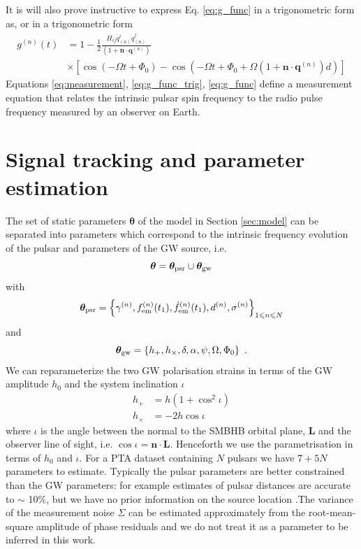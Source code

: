 \documentclass[fleqn,usenatbib,useAMS]{mnras}
\begin{document}
It is will also prove instructive to express Eq. \ref{eq:g_func} in a trigonometric form as,
or in a trigonometric form 
\begin{align}
	g^{(n)}(t) &= 1 - \frac{1}{2} \frac{ H_{ij}q^i_{(n)} q^j_{(n)} }{(1 + \boldsymbol{n}\cdot \boldsymbol{q}^{(n)}) } \nonumber \\
	& \times \left[ \cos(-\Omega t +\Phi_0) - \cos \left(-\Omega t +\Phi_0 + \Omega \left(1 + \boldsymbol{n}\cdot \boldsymbol{q}^{(n)} \right)  d \right) \right]
	\label{eq:g_func_trig}
\end{align}
Equations \ref{eq:measurement}, \ref{eq:g_func_trig}, \ref{eq:g_func}  define a measurement equation that relates the intrinsic pulsar spin frequency to the radio pulse frequency measured by an observer on Earth. 



\section{Signal tracking and parameter estimation} \label{sec:detect}
The set of static parameters $\boldsymbol{\theta}$ of the model in Section \ref{sec:model} can be separated into parameters which correspond to the intrinsic frequency evolution of the pulsar and parameters of the GW source, i.e. 
\begin{equation}
	\boldsymbol{\theta} =  \boldsymbol{\theta}_{\rm psr} \cup \boldsymbol{\theta}_{\rm gw} \label{eq:params1}
\end{equation}
with
\begin{equation}
	\boldsymbol{\theta}_{\rm psr} = \left \{ \gamma^{(n)}, f_{\rm em}^{(n)}(t_1),\dot{f}_{\rm em}^{(n)}(t_1),d^{(n)},\sigma^{(n)}\right\}_{1\leq n \leq N}
\end{equation}
and
\begin{equation}
	\boldsymbol{\theta}_{\rm gw} = \left \{h_{+}, h_{\times}, \delta, \alpha, \psi, \Omega, \Phi_0 \right \} \ .  \label{eq:params3}
\end{equation}
We can reparameterize the two GW polarisation strains in terms of the GW amplitude $h_0$ and the system inclination $\iota$
\begin{align}
	h_+ &= h(1 + \cos^2 \iota) 	\label{eq:hphx} \\
	h_{\times} &= -2h\cos \iota 	\label{eq:hphx2}
\end{align}
where $\iota$ is the angle between the normal to the SMBHB orbital plane, $\boldsymbol{L}$ and the observer line of sight, i.e. $\cos \iota = \boldsymbol{n} \cdot \boldsymbol{L}$. Henceforth we use the parametrisation in terms of $h_0$ and $\iota$. For a PTA dataset containing $N$ pulsars we have $7 + 5N$ parameters to estimate. Typically the pulsar parameters are better constrained than the GW parameters: for example estimates of pulsar distances are accurate to $\sim$ 10$\%$, but we have no prior information on the source location \citep{Cordes2002astro.ph..7156C, Verbiest2012ApJ...755...39V, Desvignes2016,Yao2017}.The variance of the measurement noise $\Sigma$ can be estimated approximately from the root-mean-square amplitude of phase residuals and we do not treat it as a parameter to be inferred in this work. \newline 
\end{document}
